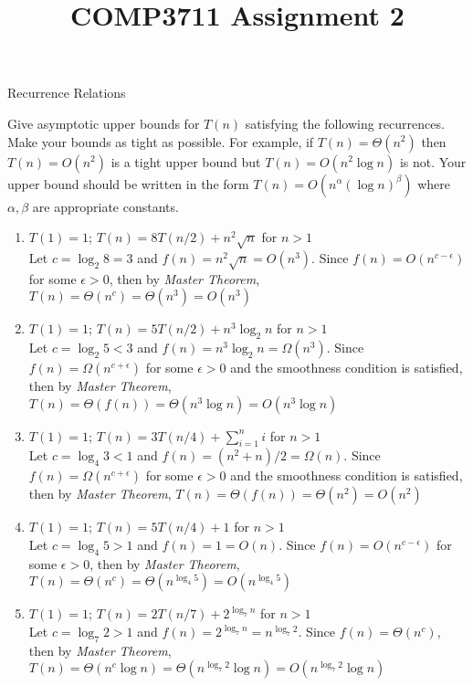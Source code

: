 \documentclass{article}
\title{COMP3711 Assignment 2}
\begin{document}
\maketitle

\begin{section}{Recurrence Relations}

Give asymptotic upper bounds for $T(n)$ satisfying the following recurrences.
Make your bounds as tight as possible. For example, if $T(n) = \Theta(n^2)$ then
$T(n) = O(n^2)$ is a tight upper bound but $T(n) = O(n^2 \log n)$ is not. Your
upper bound should be written in the form $T(n) = O(n^\alpha(\log n)^\beta)$ where  
$\alpha, \beta$ are appropriate constants.

\begin{enumerate}
    \item $T(1) = 1$; $T(n) = 8T(n/2) + n^2  \sqrt{n}$ for $n > 1$ \\
    Let $c = \log_2 8 = 3$ and $f(n) = n^2 \sqrt{n} = O(n^3)$. Since $f(n) = O(n^{c-\epsilon})$ for some $\epsilon > 0$, then by {\em Master Theorem}, $\boxed{T(n) = \Theta(n^c) = \Theta (n^3) = O(n^3)}$
    
    \item $T(1) = 1$; $T(n) = 5T(n/2) + n^3 \log_2 n$ for $n > 1$ \\
    Let $c = \log_2 5 < 3$ and $f(n) = n^3 \log_2 n = \Omega(n^3)$. Since $f(n) = \Omega(n^{c+\epsilon})$ for some $\epsilon > 0$ and the smoothness condition is satisfied, then by {\em Master Theorem}, $\boxed{T(n) = \Theta(f(n)) = \Theta (n^3 \log n) = O(n^3 \log n)}$
    
    \item $T(1) = 1$; $T(n) = 3T(n/4) + \sum_{i=1}^n i$ for $n > 1$\\
    Let $c = \log_4 3 < 1$ and $f(n) = (n^2 + n)/2 = \Omega(n)$. Since $f(n) = \Omega(n^{c+\epsilon})$ for some $\epsilon > 0$ and the smoothness condition is satisfied, then by {\em Master Theorem}, $\boxed{T(n) = \Theta(f(n)) = \Theta (n^2) = O(n^2)}$

    \item $T(1) = 1$; $T(n) = 5T(n/4) + 1$ for $n > 1$\\
    Let $c = \log_4 5 > 1$ and $f(n) = 1 = O(n)$. Since $f(n) = O(n^{c-\epsilon})$ for some $\epsilon > 0$, then by {\em Master Theorem}, $\boxed{T(n) = \Theta(n^c) = \Theta (n^{\log_4 5}) = O(n^{\log_4 5})}$

    \item $T(1) = 1$; $T(n) = 2T(n/7) + 2^{\log_7 n}$ for $n > 1$\\
    Let $c = \log_7 2 > 1$ and $f(n) = 2^{\log_7 n} = n^{\log_7 2}$. Since $f(n) = \Theta(n^c)$, then by {\em Master Theorem}, $\boxed{T(n) = \Theta(n^c \log n) = \Theta (n^{\log_7 2} \log n) = O (n^{\log_7 2} \log n)}$


\end{enumerate}
\end{section}
\end{document}
